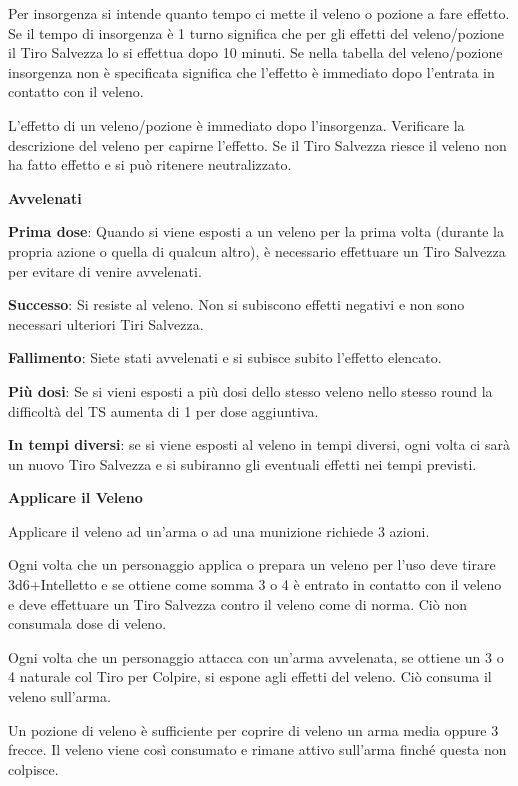 \documentclass[a4paper,11pt,twoside,openany]{book}
\begin{document}
{Per insorgenza si intende quanto tempo ci mette il veleno o pozione a fare effetto. Se il tempo di insorgenza è 1 turno significa che per gli effetti del veleno/pozione il Tiro Salvezza lo si effettua dopo 10 minuti. Se nella tabella del veleno/pozione insorgenza non è specificata significa che l'effetto è immediato dopo l'entrata in contatto con il veleno.

L'effetto di un veleno/pozione è immediato dopo l'insorgenza. Verificare la descrizione del veleno per capirne l'effetto. Se il Tiro Salvezza riesce il veleno non ha fatto effetto e si può ritenere neutralizzato. 

\bigskip

\textbf{Avvelenati}

\textbf{Prima dose}: Quando si viene esposti a un veleno per la prima volta (durante la propria azione o quella di qualcun altro), è necessario effettuare un Tiro Salvezza per evitare di venire avvelenati. 

\textbf{Successo}: Si resiste al veleno. Non si subiscono effetti negativi e non sono necessari ulteriori Tiri Salvezza.

\textbf{Fallimento}: Siete stati avvelenati e si subisce subito l'effetto elencato.

\textbf{Più dosi}: Se si vieni esposti a più dosi dello stesso veleno nello stesso round la difficoltà del TS aumenta di 1 per dose aggiuntiva.

\textbf{In tempi diversi}: se si viene esposti al veleno in tempi diversi, ogni volta ci sarà un nuovo Tiro Salvezza e si subiranno gli eventuali effetti nei tempi previsti.

\bigskip

\textbf{Applicare il Veleno}

Applicare il veleno ad un'arma o ad una munizione richiede 3 azioni.

Ogni volta che un personaggio applica o prepara un veleno per l'uso deve tirare 3d6+Intelletto e se ottiene come somma 3 o 4 è entrato in contatto con il veleno e deve effettuare un Tiro Salvezza contro il veleno come di norma. Ciò non consumala dose di veleno. 

Ogni volta che un personaggio attacca con un'arma avvelenata, se ottiene un 3 o 4 naturale col Tiro per Colpire, si espone agli effetti del veleno. Ciò consuma il veleno sull'arma.

Un pozione di veleno è sufficiente per coprire di veleno un arma media oppure 3 frecce. Il veleno viene così consumato e rimane attivo sull'arma finché questa non colpisce.

}
\end{document}

